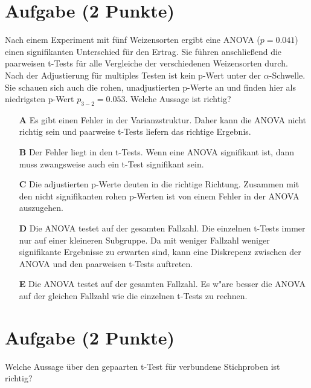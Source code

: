 \documentclass[a4paper, 10pt]{scrartcl}\usepackage[]{graphicx}\usepackage[]{xcolor}
\begin{document}
\section{Aufgabe \hfill (2 Punkte)}

Nach einem Experiment mit f{\"u}nf Weizensorten ergibt eine ANOVA ($p = 0.041$)
einen signifikanten Unterschied f{\"u}r den Ertrag. Sie f{\"u}hren anschlie{\ss}end die
paarweisen t-Tests f{\"u}r alle Vergleiche der verschiedenen Weizensorten
durch. Nach der Adjustierung f{\"u}r multiples Testen ist kein p-Wert unter der
$\alpha$-Schwelle. Sie schauen sich auch die rohen, unadjustierten p-Werte
an und finden hier als niedrigsten p-Wert $p_{3-2} = 0.053$. Welche Aussage
ist richtig? 



\begin{enumerate}
\item [\textbf{A} \msquare] Es gibt einen Fehler in der Varianzstruktur. Daher kann die ANOVA nicht richtig sein und paarweise t-Tests liefern das richtige Ergebnis.
\item [\textbf{B} \msquare] Der Fehler liegt in den t-Tests. Wenn eine ANOVA signifikant ist, dann muss zwangsweise auch ein t-Test signifikant sein.
\item [\textbf{C} \msquare] Die adjustierten p-Werte deuten in die richtige Richtung. Zusammen mit den nicht signifikanten rohen p-Werten ist von einem Fehler in der ANOVA auszugehen.
\item [\textbf{D} \msquare] Die ANOVA testet auf der gesamten Fallzahl. Die einzelnen t-Tests immer nur auf einer kleineren Subgruppe. Da mit weniger Fallzahl weniger signifikante Ergebnisse zu erwarten sind, kann eine Diskrepenz zwischen der ANOVA und den paarweisen t-Tests auftreten.
\item [\textbf{E} \msquare] Die ANOVA testet auf der gesamten Fallzahl. Es w{"a}re besser die ANOVA auf der gleichen Fallzahl wie die einzelnen t-Tests zu rechnen.
\end{enumerate}

\section{Aufgabe \hfill (2 Punkte)}

Welche Aussage {\"u}ber den gepaarten t-Test f{\"u}r verbundene Stichproben ist richtig?
\end{document}
